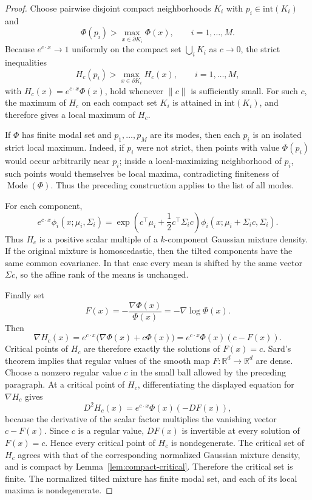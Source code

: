 \documentclass[11pt]{article}
\theoremstyle{plain}
\theoremstyle{definition}
\theoremstyle{remark}
\numberwithin{equation}{section}
\DeclareMathOperator{\Mode}{Mode}
\newcommand{\R}{\mathbb{R}}
\begin{document}
\begin{proof}
Choose pairwise disjoint compact neighborhoods $K_i$ with $p_i\in\mathrm{int}(K_i)$ and
\[
\Phi(p_i)>\max_{x\in\partial K_i}\Phi(x),
\qquad i=1,\dots,M.
\]
Because $e^{c\cdot x}\to 1$ uniformly on the compact set $\bigcup_iK_i$ as $c\to 0$, the strict inequalities
\[
H_c(p_i)>\max_{x\in\partial K_i}H_c(x),
\qquad i=1,\dots,M,
\]
with $H_c(x)=e^{c\cdot x}\Phi(x)$, hold whenever $\|c\|$ is sufficiently small. For such $c$, the maximum of $H_c$ on each compact set $K_i$ is attained in $\mathrm{int}(K_i)$, and therefore gives a local maximum of $H_c$.

If $\Phi$ has finite modal set and $p_1,\dots,p_M$ are its modes, then each $p_i$ is an isolated strict local maximum. Indeed, if $p_i$ were not strict, then points with value $\Phi(p_i)$ would occur arbitrarily near $p_i$; inside a local-maximizing neighborhood of $p_i$, such points would themselves be local maxima, contradicting finiteness of $\Mode(\Phi)$. Thus the preceding construction applies to the list of all modes.

For each component,
\[
e^{c\cdot x}\phi_i(x;\mu_i,\Sigma_i)
=\exp\left(c^\top\mu_i+\frac12c^\top\Sigma_i c\right)
\phi_i(x;\mu_i+\Sigma_i c,\Sigma_i).
\]
Thus $H_c$ is a positive scalar multiple of a $k$-component Gaussian mixture density. If the original mixture is homoscedastic, then the tilted components have the same common covariance. In that case every mean is shifted by the same vector $\Sigma c$, so the affine rank of the means is unchanged.

Finally set
\[
F(x)=-\frac{\nabla\Phi(x)}{\Phi(x)}=-\nabla\log\Phi(x).
\]
Then
\[
\nabla H_c(x)=e^{c\cdot x}\bigl(\nabla\Phi(x)+c\Phi(x)\bigr)
=e^{c\cdot x}\Phi(x)(c-F(x)).
\]
Critical points of $H_c$ are therefore exactly the solutions of $F(x)=c$. Sard's theorem implies that regular values of the smooth map $F:\R^d\to\R^d$ are dense. Choose a nonzero regular value $c$ in the small ball allowed by the preceding paragraph. At a critical point of $H_c$, differentiating the displayed equation for $\nabla H_c$ gives
\[
D^2H_c(x)=e^{c\cdot x}\Phi(x)(-DF(x)),
\]
because the derivative of the scalar factor multiplies the vanishing vector $c-F(x)$. Since $c$ is a regular value, $DF(x)$ is invertible at every solution of $F(x)=c$. Hence every critical point of $H_c$ is nondegenerate. The critical set of $H_c$ agrees with that of the corresponding normalized Gaussian mixture density, and is compact by Lemma~\ref{lem:compact-critical}. Therefore the critical set is finite. The normalized tilted mixture has finite modal set, and each of its local maxima is nondegenerate.
\end{proof}
\end{document}
